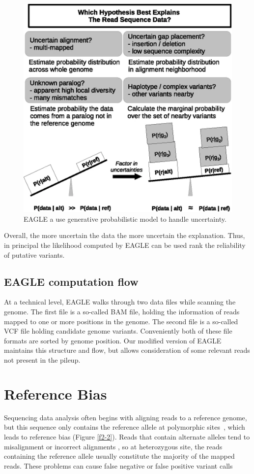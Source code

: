 \begin{figure}[H]
\includegraphics[width=0.6\columnwidth]{body/image/2-1.png}
\caption[EAGLE model]{EAGLE a use generative probabilistic model to handle uncertainty.}
\label{f2-1}
\end{figure}

Overall, the more uncertain the data the more uncertain the explanation.  Thus, in principal the likelihood computed by EAGLE can be used rank the reliability of putative variants.

\subsection{EAGLE computation flow}
At a technical level, EAGLE walks through two data files while scanning the genome.  The first file is a so-called BAM file, holding the information of reads mapped to one or more positions in the genome.  The second file is a so-called VCF file holding candidate genome variants.  Conveniently both of these file formats are sorted by genome position.  Our modified version of EAGLE maintains this structure and flow, but allows consideration of some relevant reads not present in the pileup.


\section{Reference Bias}
Sequencing data analysis often begins with aligning reads to a reference genome, but this sequence only contains the reference allele at polymorphic sites~\cite{martiniano2020removing}, which leads to reference bias (Figure \ref{f2-2}).  Reads that contain alternate alleles tend to misalignment or incorrect alignments \cite{chen2021reference}, so at heterozygous site, the reads containing the reference allele usually constitute the majority of the mapped reads.  These problems can cause false negative or false positive variant calls~\cite{gunther2019presence}

